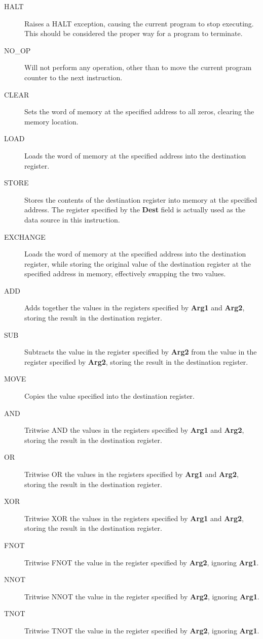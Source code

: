 \documentclass[12pt]{article}
\begin{document}
\begin{description}
\item[HALT] Raises a HALT exception, causing the current program to stop executing.
This should be considered the proper way for a program to terminate.
\item[NO\_OP] Will not perform any operation, other than to move the current program counter to the
next instruction.
\item[CLEAR] Sets the word of memory at the specified address to all zeros, clearing the memory location.
\item[LOAD] Loads the word of memory at the specified address into the destination register.
\item[STORE] Stores the contents of the destination register into memory at the specified address.
The register specified by the \textbf{Dest} field is actually used as the data source in this instruction.
\item[EXCHANGE] Loads the word of memory at the specified address into the destination register,
while storing the original value of the destination register at the specified address in memory,
effectively swapping the two values.
\item[ADD] Adds together the values in the registers specified by \textbf{Arg1} and \textbf{Arg2},
storing the result in the destination register.
\item[SUB] Subtracts the value in the register specified by \textbf{Arg2} from the value in the register
specified by \textbf{Arg2}, storing the result in the destination register.
\item[MOVE] Copies the value specified into the destination register.
\item[AND] Tritwise AND the values in the registers specified by \textbf{Arg1} and \textbf{Arg2},
storing the result in the destination register.
\item[OR] Tritwise OR the values in the registers specified by \textbf{Arg1} and \textbf{Arg2},
storing the result in the destination register.
\item[XOR] Tritwise XOR the values in the registers specified by \textbf{Arg1} and \textbf{Arg2},
storing the result in the destination register.
\item[FNOT] Tritwise FNOT the value in the register specified by \textbf{Arg2}, ignoring \textbf{Arg1}.
\item[NNOT] Tritwise NNOT the value in the register specified by \textbf{Arg2}, ignoring \textbf{Arg1}.
\item[TNOT] Tritwise TNOT the value in the register specified by \textbf{Arg2}, ignoring \textbf{Arg1}.

\end{description}
\end{document}
